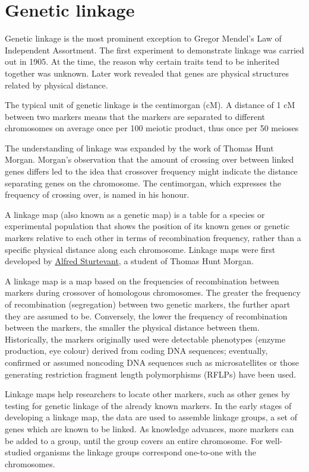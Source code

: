 \hypertarget{genetic-linkage}{%
\section{Genetic linkage}\label{genetic-linkage}}

Genetic linkage is the most prominent exception to Gregor Mendel's Law of Independent Assortment. The first experiment to demonstrate linkage was carried out in 1905. At the time, the reason why certain traits tend to be inherited together was unknown. Later work revealed that genes are physical structures related by physical distance.

The typical unit of genetic linkage is the centimorgan (cM). A distance of 1 cM between two markers means that the markers are separated to different chromosomes on average once per 100 meiotic product, thus once per 50 meioses

The understanding of linkage was expanded by the work of Thomas Hunt Morgan. Morgan's observation that the amount of crossing over between linked genes differs led to the idea that crossover frequency might indicate the distance separating genes on the chromosome. The centimorgan, which expresses the frequency of crossing over, is named in his honour.

A linkage map (also known as a genetic map) is a table for a species or experimental population that shows the position of its known genes or genetic markers relative to each other in terms of recombination frequency, rather than a specific physical distance along each chromosome. Linkage maps were first developed by \href{https://en.wikipedia.org/wiki/Alfred_Sturtevant}{Alfred Sturtevant}, a student of Thomas Hunt Morgan.

A linkage map is a map based on the frequencies of recombination between markers during crossover of homologous chromosomes. The greater the frequency of recombination (segregation) between two genetic markers, the further apart they are assumed to be. Conversely, the lower the frequency of recombination between the markers, the smaller the physical distance between them. Historically, the markers originally used were detectable phenotypes (enzyme production, eye colour) derived from coding DNA sequences; eventually, confirmed or assumed noncoding DNA sequences such as microsatellites or those generating restriction fragment length polymorphisms (RFLPs) have been used.

Linkage maps help researchers to locate other markers, such as other genes by testing for genetic linkage of the already known markers. In the early stages of developing a linkage map, the data are used to assemble linkage groups, a set of genes which are known to be linked. As knowledge advances, more markers can be added to a group, until the group covers an entire chromosome. For well-studied organisms the linkage groups correspond one-to-one with the chromosomes.

